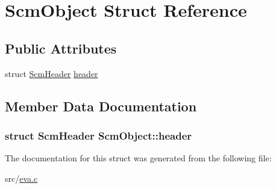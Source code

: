 \hypertarget{struct_scm_object}{\section{Scm\-Object Struct Reference}
\label{struct_scm_object}
}
\subsection*{Public Attributes}
\begin{DoxyCompactItemize}
\item 
struct \hyperlink{struct_scm_header}{Scm\-Header} \hyperlink{struct_scm_object_a82c4a56927c1bb223762ab503e390351}{header}
\end{DoxyCompactItemize}


\subsection{Member Data Documentation}
\hypertarget{struct_scm_object_a82c4a56927c1bb223762ab503e390351}{
\subsubsection[{header}]{\setlength{\rightskip}{0pt plus 5cm}struct {\bf Scm\-Header} Scm\-Object\-::header}}\label{struct_scm_object_a82c4a56927c1bb223762ab503e390351}


The documentation for this struct was generated from the following file\-:\begin{DoxyCompactItemize}
\item 
src/\hyperlink{eva_8c}{eva.\-c}\end{DoxyCompactItemize}
